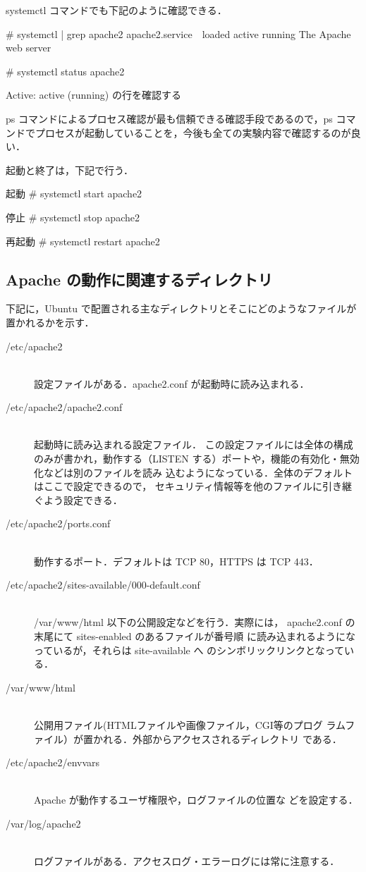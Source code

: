 systemctl コマンドでも下記のように確認できる．

\begin{cli}
# systemctl | grep apache2
apache2.service　loaded active running  The Apache web server

# systemctl status apache2

Active: active (running) の行を確認する
\end{cli}

ps コマンドによるプロセス確認が最も信頼できる確認手段であるので，ps コマンドでプロセスが起動していることを，今後も全ての実験内容で確認するのが良い．

起動と終了は，下記で行う．

\begin{cli}
起動
# systemctl start apache2

停止
# systemctl stop apache2

再起動
# systemctl restart apache2
\end{cli}

\subsection{Apache の動作に関連するディレクトリ}

下記に，Ubuntu で配置される主なディレクトリとそこにどのようなファイルが置かれるかを示す．

\begin{description}
 \item[/etc/apache2] \ \\
            設定ファイルがある．apache2.conf が起動時に読み込まれる．
 \item[/etc/apache2/apache2.conf] \ \\ 起動時に読み込まれる設定ファイル．
	    この設定ファイルには全体の構成のみが書かれ，動作する（LISTEN
            する）ポートや，機能の有効化・無効化などは別のファイルを読み
            込むようになっている．全体のデフォルトはここで設定できるので，
	    セキュリティ情報等を他のファイルに引き継ぐよう設定できる．
 \item[/etc/apache2/ports.conf]  \ \\ 動作するポート．デフォルトは TCP
	    80，HTTPS は TCP 443．
 \item[/etc/apache2/sites-available/000-default.conf] \ \\
	    /var/www/html 以下の公開設定などを行う．実際には，
	    apache2.conf の末尾にて sites-enabled のあるファイルが番号順
	    に読み込まれるようになっているが，それらは site-available へ
	    のシンボリックリンクとなっている．
 \item[/var/www/html] \ \\
            公開用ファイル(HTMLファイルや画像ファイル，CGI等のプログ
	    ラムファイル）が置かれる．外部からアクセスされるディレクトリ
	    である．
 \item[/etc/apache2/envvars] \ \\ Apache が動作するユーザ権限や，ログファイルの位置な
	    どを設定する．
 \item[/var/log/apache2] \ \\
            ログファイルがある．アクセスログ・エラーログには常に注意する．
\end{description}

